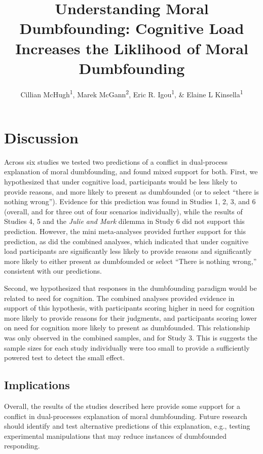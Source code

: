 \documentclass[
  american,
  man,floatsintext]{apa7}
\title{Understanding Moral Dumbfounding: Cognitive Load Increases the Liklihood of Moral Dumbfounding}
\author{Cillian McHugh\textsuperscript{1}, Marek McGann\textsuperscript{2}, Eric R. Igou\textsuperscript{1}, \& Elaine L Kinsella\textsuperscript{1}}
\date{}
\affiliation{\vspace{0.5cm}\textsuperscript{1} University of Limerick\\\textsuperscript{2} Mary Immaculate College \textasciitilde{} University of Limerick}
\begin{document}
\maketitle

{
\setcounter{tocdepth}{3}
\tableofcontents
}
\hypertarget{discussion}{%
\section{Discussion}\label{discussion}}

Across six studies we tested two predictions of a conflict in dual-process explanation of moral dumbfounding, and found mixed support for both. First, we hypothesized that under cognitive load, participants would be less likely to provide reasons, and more likely to present as dumbfounded (or to select ``there is nothing wrong''). Evidence for this prediction was found in Studies 1, 2, 3, and 6 (overall, and for three out of four scenarios individually), while the results of Studies 4, 5 and the \emph{Julie and Mark} dilemma in Study 6 did not support this prediction. However, the mini meta-analyses provided further support for this prediction, as did the combined analyses, which indicated that under cognitive load participants are significantly less likely to provide reasons and significantly more likely to either present as dumbfounded or select ``There is nothing wrong,'' consistent with our predictions.

Second, we hypothesized that responses in the dumbfounding paradigm would be related to need for cognition. The combined analyses provided evidence in support of this hypothesis, with participants scoring higher in need for cognition more likely to provide reasons for their judgments, and participants scoring lower on need for cognition more likely to present as dumbfounded. This relationship was only observed in the combined samples, and for Study 3. This is suggests the sample sizes for each study individually were too small to provide a sufficiently powered test to detect the small effect.

\hypertarget{implications}{%
\subsection{Implications}\label{implications}}

Overall, the results of the studies described here provide some support for a conflict in dual-processes explanation of moral dumbfounding. Future research should identify and test alternative predictions of this explanation, e.g., testing experimental manipulations that may reduce instances of dumbfounded responding.
\end{document}
